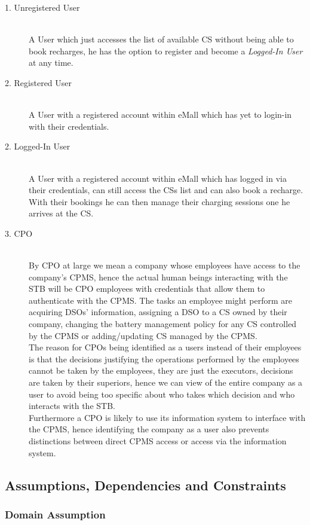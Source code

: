 \documentclass[11pt]{article}
\begin{document}
\begin{description}
    \item [1. Unregistered User] \hfill \\
        A User which just accesses the list of available CS without being able to book recharges, he has the option to register and become a \textit{Logged-In User} at any time.
    \item [2. Registered User] \hfill \\
        A User with a registered account within eMall which has yet to login-in with their credentials.
    \item [2. Logged-In User] \hfill \\
        A User with a registered account within eMall which has logged in via their credentials, can still access the CSs list and can also book a recharge. With their bookings he can then manage their charging sessions one he arrives at the CS.
    \item [3. CPO] \hfill \\
        By CPO at large we mean a company whose employees have access to the company's CPMS, hence the actual human beings interacting with the STB will be CPO employees with credentials that allow them to authenticate with the CPMS. The tasks an employee might perform are acquiring DSOs' information, assigning a DSO to a CS owned by their company, changing the battery management policy for any CS controlled by the CPMS or adding/updating CS managed by the CPMS. \\
        The reason for CPOs being identified as a users instead of their employees is that the decisions justifying the operations performed by the employees cannot be taken by the employees, they are just the executors, decisions are taken by their superiors, hence we can view of the entire company as a user to avoid being too specific about who takes which decision and who interacts with the STB. \\
        Furthermore a CPO is likely to use its information system to interface with the CPMS, hence identifying the company as a user also prevents distinctions between direct CPMS access or access via the information system.
\end{description}

\subsection{Assumptions, Dependencies and Constraints}

\subsubsection{Domain Assumption}
\end{document}
